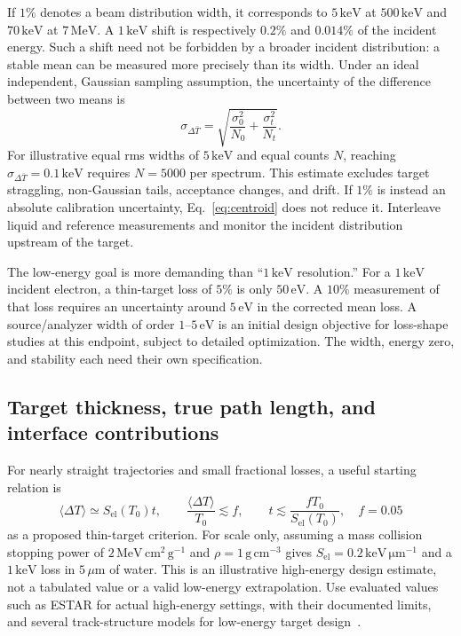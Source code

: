 \documentclass[11pt,letterpaper]{article}
\newcommand{\eV}{\,\mathrm{eV}}
\newcommand{\keV}{\,\mathrm{keV}}
\newcommand{\MeV}{\,\mathrm{MeV}}
\newcommand{\um}{\,\mu\mathrm{m}}
\begin{document}
If $1\%$ denotes a beam distribution width, it corresponds to $5\keV$ at $500\keV$ and
$70\keV$ at $7\MeV$. A $1\keV$ shift is respectively $0.2\%$ and $0.014\%$ of the incident
energy. Such a shift need not be forbidden by a broader incident distribution: a stable mean can be
measured more precisely than its width. Under an ideal independent, Gaussian sampling assumption,
the uncertainty of the difference between two means is
\begin{equation}
  \sigma_{\Delta\bar T}=
  \sqrt{\frac{\sigma_0^2}{N_0}+\frac{\sigma_t^2}{N_t}}.
  \label{eq:centroid}
\end{equation}
For illustrative equal rms widths of $5\keV$ and equal counts $N$, reaching
$\sigma_{\Delta\bar T}=0.1\keV$ requires $N=5000$ per spectrum. This estimate excludes target
straggling, non-Gaussian tails, acceptance changes, and drift. If $1\%$ is instead an absolute
calibration uncertainty, Eq.~\ref{eq:centroid} does not reduce it. Interleave liquid and reference
measurements and monitor the incident distribution upstream of the target.

The low-energy goal is more demanding than ``$1\keV$ resolution.'' For a $1\keV$ incident electron,
a thin-target loss of $5\%$ is only $50\eV$. A $10\%$ measurement of that loss requires an uncertainty
around $5\eV$ in the corrected mean loss. A source/analyzer width of order $1$--$5\eV$ is an initial
design objective for loss-shape studies at this endpoint, subject to detailed optimization. The width,
energy zero, and stability each need their own specification.

\subsection{Target thickness, true path length, and interface contributions}

For nearly straight trajectories and small fractional losses, a useful starting relation is
\begin{equation}
  \langle\Delta T\rangle\simeq S_{\mathrm{el}}(T_0)t,
  \qquad \frac{\langle\Delta T\rangle}{T_0}\lesssim f,
  \qquad t\lesssim\frac{f T_0}{S_{\mathrm{el}}(T_0)},\quad f=0.05
  \label{eq:thin}
\end{equation}
as a proposed thin-target criterion. For scale only, assuming a mass collision stopping power of
$2\,\mathrm{MeV\,cm^2\,g^{-1}}$ and $\rho=1\,\mathrm{g\,cm^{-3}}$ gives
$S_{\mathrm{el}}=0.2\,\mathrm{keV\,\mu m^{-1}}$ and a $1\keV$ loss in $5\um$ of water. This is an
illustrative high-energy design estimate, not a tabulated value or a valid low-energy extrapolation.
Use evaluated values such as ESTAR for actual high-energy settings, with their documented limits,
and several track-structure models for low-energy target design~\cite{estar,kyriakou}.
\end{document}
